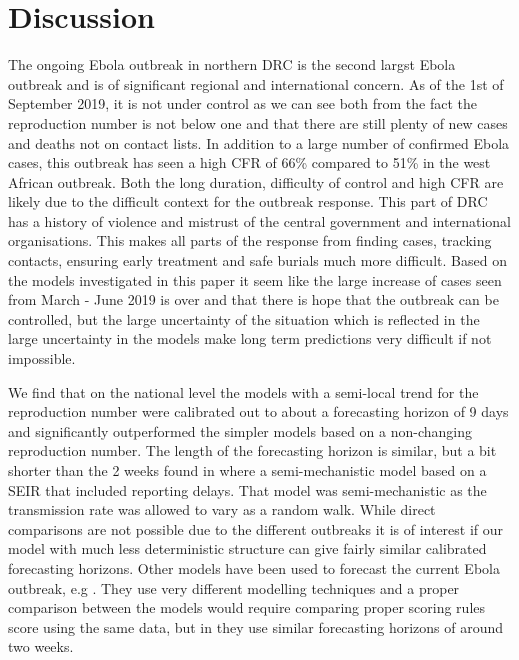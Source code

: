 \documentclass[12pt]{article}
\begin{document}
\section{Discussion}


The ongoing Ebola outbreak in northern DRC is the second largst Ebola outbreak and is of significant regional and international concern. As of the 1st of September 2019, it is not under control as we can see both from the fact the reproduction number is not below one and that there are still plenty of new cases and deaths not on contact lists. In addition to a large number of confirmed Ebola cases, this outbreak has seen a high CFR of 66\% compared to 51\% in the west African outbreak\cite{rojekSystematicReviewMetaanalysis2019}. Both the long duration, difficulty of control and high CFR are likely due to the difficult context for the outbreak response. This part of DRC has a history of violence and mistrust of the central government and international organisations. This makes all parts of the response from finding cases, tracking contacts, ensuring early treatment and safe burials much more difficult. Based on the models investigated in this paper it seem like the large increase of cases seen from March - June 2019 is over and that there is hope that the outbreak can be controlled, but the large uncertainty of the situation which is reflected in the large uncertainty in the models make long term predictions very difficult if not impossible.

We find that on the national level the models with a semi-local trend for the reproduction number were calibrated out to about a forecasting horizon of 9 days and significantly outperformed the simpler models based on a non-changing reproduction number. The length of the forecasting horizon is similar, but a bit shorter than the 2 weeks found in \cite{funkAssessingPerformanceRealtime2019} where a semi-mechanistic model based on a SEIR that included reporting delays. That model was semi-mechanistic as the transmission rate was allowed to vary as a random walk. While direct comparisons are not possible due to the different outbreaks it is of interest if our model with much less deterministic structure can give fairly similar calibrated forecasting horizons. Other models have been used to forecast the current Ebola outbreak, e.g \cite{kellyRealtimePredictions201820192019, akhmetzhanovAnalyzingForecastingEbola2019}. They use very different modelling techniques and a proper comparison between the models would require comparing proper scoring rules score using the same data, but in \cite{akhmetzhanovAnalyzingForecastingEbola2019} they use similar forecasting horizons of around two weeks.
\end{document}
